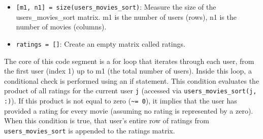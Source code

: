 \begin{itemize}[label=-]
	\item \texttt{[m1, n1] = size(users\_movies\_sort)}: Measure the size of the users\_movies\_sort matrix. m1 is the number of users (rows), n1 is the number of movies (columns).
	\item \texttt{ratings = []}: Create an empty matrix called ratings.
\end{itemize}

The core of this code segment is a for loop that iterates through each user, from the first user (index 1) up to m1 (the total number of users). Inside this loop, a conditional check is performed using an if statement. This condition evaluates the product of all ratings for the current user \texttt{j} (accessed via \texttt{users\_movies\_sort(j, :)}). If this product is not equal to zero (\texttt{\textasciitilde = 0}), it implies that the user has provided a rating for every movie (assuming no rating is represented by a zero). When this condition is true, that user's entire row of ratings from \texttt{users\_movies\_sort} is appended to the ratings matrix.